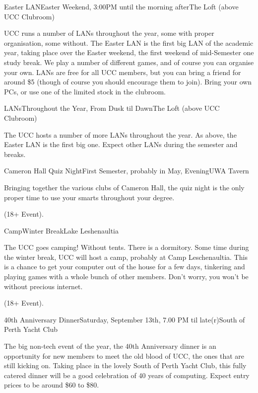 \begin{event}{Easter LAN}{Easter Weekend, 3:00PM until the morning after}{The Loft (above UCC Clubroom)}

UCC runs a number of LANs throughout the year, some with proper organisation, some without. The Easter LAN is the first big LAN of the academic year, taking place over the Easter weekend, the first weekend of mid-Semester one study break. We play a number of different games, and of course you can organise your own. LANs are free for all UCC members, but you can bring a friend for around \$5 (though of course you should encourage them to join). Bring your own PCs, or use one of the limited stock in the clubroom.

\end{event}


\begin{event}{LANs}{Throughout the Year, From Dusk til Dawn}{The Loft (above UCC Clubroom)}

The UCC hosts a number of more LANs throughout the year. As above, the Easter LAN is the first big one. Expect other LANs during the semester and breaks.

\end{event}

\begin{event}{Cameron Hall Quiz Night}{First Semester, probably in May, Evening}{UWA Tavern}

Bringing together the various clubs of Cameron Hall, the quiz night is the only proper time to use your smarts throughout your degree.

 (18+ Event).

\end{event}


\begin{event}{Camp}{Winter Break}{Lake Leshenaultia}

The UCC goes camping! Without tents. There is a dormitory. Some time during the winter break, UCC will host a camp, probably at Camp Leschenaultia. This is a chance to get your computer out of the house for a few days, tinkering and playing games with a whole bunch of other members. Don't worry, you won't be without precious internet.

 (18+ Event).

\end{event}
\pagebreak


\begin{event}{40th Anniversary Dinner}{Saturday, September 13th, 7.00 PM til late(r)}{South of Perth Yacht Club}

The big non-tech event of the year, the 40th Anniversary dinner is an opportunity for new members to meet the old blood of UCC, the ones that are still kicking on. Taking place in the lovely South of Perth Yacht Club, this fully catered dinner will be a good celebration of 40 years of computing. Expect entry prices to be around \$60 to \$80.

\end{event}

